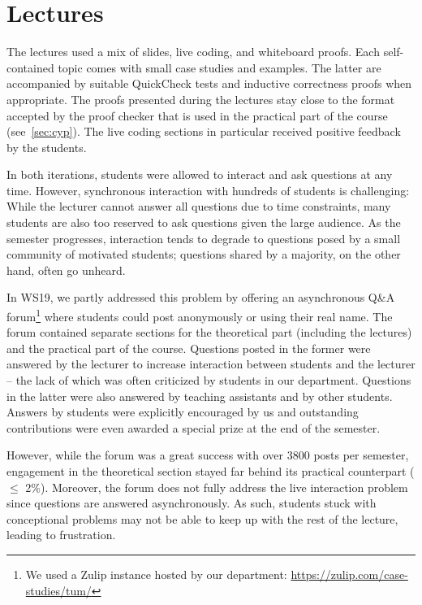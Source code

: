 \section{Lectures}\label{sec:lectures}

The lectures used a mix of
slides,
live coding, and whiteboard proofs.
Each self-contained topic comes with small case studies and examples.
The latter are accompanied by suitable QuickCheck tests
and inductive correctness proofs when appropriate.
The proofs presented during the lectures stay close to the format accepted by the proof checker that is used in the practical part of the course (see~\cref{sec:cyp}).
The live coding sections in particular received positive feedback by the students.

In both iterations, students were allowed to interact and ask questions at any time.
However, synchronous interaction with hundreds of students is challenging:
While the lecturer cannot answer all questions due to time constraints,
many students are also too reserved to ask questions given the large audience.
As the semester progresses, interaction tends to degrade to
questions posed by a small community of motivated students;
questions shared by a majority, on the other hand, often go unheard.

In WS19, we partly addressed this problem by offering an asynchronous Q\&A forum\footnote{We used a Zulip instance hosted by our department: \url{https://zulip.com/case-studies/tum/}}
where students could post anonymously or using their real name.
The forum contained separate sections for the theoretical part (including the lectures)
and the practical part of the course.
Questions posted in the former were answered by the lecturer
to increase interaction between students and the lecturer -- the lack of which was often criticized by students in our department.
Questions in the latter were also answered by teaching assistants and by other students.
Answers by students were explicitly encouraged by us and
outstanding contributions were even awarded a special prize at the end of the semester.

However, while the forum was a great success with over 3800 posts per semester,
engagement in the theoretical section stayed far behind its practical counterpart ($\leq$ 2\%).
Moreover, the forum does not fully address the live interaction problem since
questions are answered asynchronously.
As such, students stuck with conceptional problems may not be able
to keep up with the rest of the lecture,
leading to frustration.

